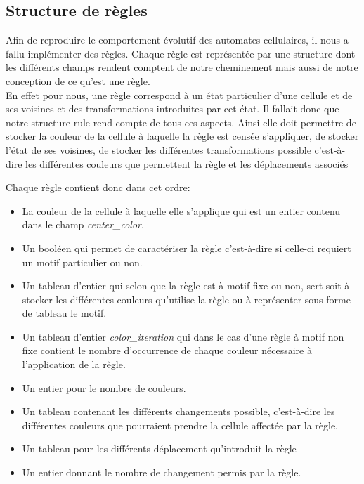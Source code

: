 \documentclass[11pt, a4paper]{article}
\begin{document}
\subsection{Structure de règles}

Afin de reproduire le comportement évolutif des automates cellulaires, il nous a fallu implémenter des règles. 
Chaque règle est représentée par une structure dont les différents champs rendent comptent de notre cheminement mais aussi de notre conception de ce qu'est une règle.
\\

En effet pour nous, une règle correspond à un état particulier d'une cellule et de ses voisines et des transformations introduites par cet état. Il fallait donc que notre structure rule rend compte de tous ces aspects. 
Ainsi elle doit permettre de stocker la couleur de la cellule à laquelle la règle est censée s'appliquer, de stocker l'état de ses voisines, de stocker les différentes transformations possible c'est-à-dire les différentes couleurs que permettent la règle et les déplacements associés    


Chaque règle contient donc dans cet ordre:
\begin{itemize}
    \item La couleur de la cellule à laquelle elle s'applique qui est un entier contenu dans le champ \textit{center\_color}.
    \item Un booléen \textit{} qui permet de caractériser la règle c'est-à-dire si celle-ci requiert un motif particulier ou non.
    \item Un tableau d'entier qui selon que la règle est à motif fixe ou non, sert soit à stocker les différentes couleurs qu'utilise la règle ou à représenter sous forme de tableau le motif.
    \item Un tableau d'entier \textit{color\_iteration} qui dans le cas d'une règle à motif non fixe contient le nombre d'occurrence de chaque couleur nécessaire à l'application de la règle.
    \item Un entier pour le nombre de couleurs.
    \item Un tableau contenant les différents changements possible, c'est-à-dire les différentes couleurs que pourraient prendre la cellule affectée par la règle.
    \item Un tableau pour les différents déplacement qu'introduit la règle 
    \item Un entier donnant le nombre de changement permis par la règle. 
    
\end{itemize} 
\end{document}
